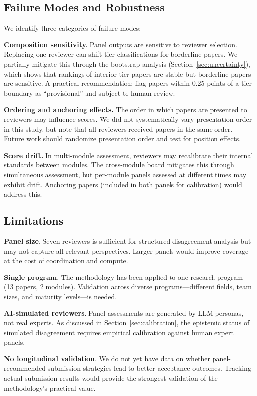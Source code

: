 \subsection{Failure Modes and Robustness}

We identify three categories of failure modes:

\textbf{Composition sensitivity.} Panel outputs are sensitive to reviewer selection. Replacing one reviewer can shift tier classifications for borderline papers. We partially mitigate this through the bootstrap analysis (Section~\ref{sec:uncertainty}), which shows that rankings of interior-tier papers are stable but borderline papers are sensitive. A practical recommendation: flag papers within 0.25 points of a tier boundary as ``provisional'' and subject to human review.

\textbf{Ordering and anchoring effects.} The order in which papers are presented to reviewers may influence scores. We did not systematically vary presentation order in this study, but note that all reviewers received papers in the same order. Future work should randomize presentation order and test for position effects.

\textbf{Score drift.} In multi-module assessment, reviewers may recalibrate their internal standards between modules. The cross-module board mitigates this through simultaneous assessment, but per-module panels assessed at different times may exhibit drift. Anchoring papers (included in both panels for calibration) would address this.

\subsection{Limitations}

\textbf{Panel size}. Seven reviewers is sufficient for structured disagreement analysis but may not capture all relevant perspectives. Larger panels would improve coverage at the cost of coordination and compute.

\textbf{Single program}. The methodology has been applied to one research program (13 papers, 2 modules). Validation across diverse programs---different fields, team sizes, and maturity levels---is needed.

\textbf{AI-simulated reviewers}. Panel assessments are generated by LLM personas, not real experts. As discussed in Section~\ref{sec:calibration}, the epistemic status of simulated disagreement requires empirical calibration against human expert panels.

\textbf{No longitudinal validation}. We do not yet have data on whether panel-recommended submission strategies lead to better acceptance outcomes. Tracking actual submission results would provide the strongest validation of the methodology's practical value.
